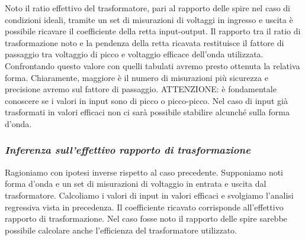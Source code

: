 \documentclass[a4paper]{article}
\begin{document}
	Noto il ratio effettivo del trasformatore, pari al rapporto delle spire nel caso di condizioni ideali, tramite un set di misurazioni di voltaggi in ingresso e uscita è possibile ricavare il coefficiente della retta input-output. Il rapporto tra il ratio di trasformazione noto e la pendenza della retta ricavata restituisce il fattore di passaggio tra voltaggio di picco e voltaggio efficace dell’onda utilizzata. Confrontando questo valore con quelli tabulati avremo presto ottenuta la relativa forma. Chiaramente, maggiore è il numero di misurazioni più sicurezza e precisione avremo sul fattore di passaggio. \newline ATTENZIONE: è fondamentale conoscere se i valori in input sono di picco o picco-picco. Nel caso di input già trasformati in valori efficaci non ci sarà possibile stabilire alcunché sulla forma d’onda.
	
	\subsubsection*{\textit{Inferenza sull’effettivo rapporto di trasformazione}}
	
	Ragioniamo con ipotesi inverse rispetto al caso precedente. Supponiamo noti forma d’onda e un set di misurazioni di voltaggio in entrata e uscita dal trasformatore. Calcoliamo i valori di input in valori efficaci e svolgiamo l’analisi regressiva vista in precedenza. Il coefficiente ricavato corrisponde all’effettivo rapporto di trasformazione. Nel caso fosse noto il rapporto delle spire sarebbe possibile calcolare anche l’efficienza del trasformatore utilizzato.  
	
	
	
	
	
	
	
	\newpage
	\thispagestyle{empty}
\end{document}
